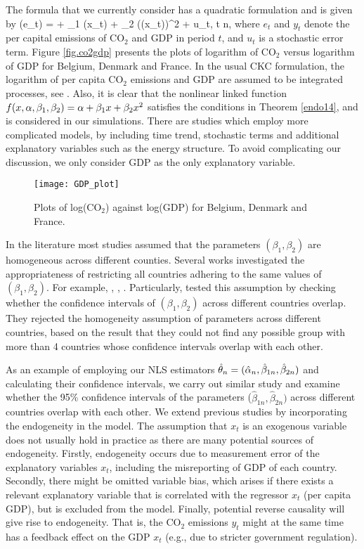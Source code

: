 The formula that we currently consider has a quadratic formulation and is given by
\be {}
\ln(e_{t}) = \al + \beta_1 \ln(x_t) + \beta_2 (\ln(x_t))^2 + u_t,  \le t \le n,
\ee
where $e_t$ and $y_t$ denote the per capital emissions of CO$_2$ and GDP in period $t$, and $u_t$ is a stochastic error term. Figure \ref{fig.co2gdp} presents the plots of logarithm of CO$_2$ versus logarithm of GDP for Belgium, Denmark and France. In the usual CKC formulation, the logarithm of per capita CO$_2$ emissions and GDP are assumed to be integrated processes, see \cite{mullerwagner2007}. Also, it is clear that the nonlinear linked function $f(x, \alpha, \beta_1, \beta_2) = \alpha + \beta_1 x + \beta_2 x^2$ satisfies the conditions in Theorem \ref{endo14}, and is considered in our simulations. There are studies which employ more complicated models, by including time trend, stochastic terms and additional explanatory variables such as the energy structure. To avoid complicating our discussion, we only consider GDP as the only explanatory variable.

\medskip
\begin{figure}[hb]
  \centering
\texttt{[image: GDP\_plot]}
\caption{Plots of log(CO$_2$) against log(GDP) for Belgium, Denmark and France.}
\end{figure}

In the literature most studies assumed that the parameters $(\beta_1, \beta_2)$ are homogeneous across different counties. Several works investigated the appropriateness of restricting all countries adhering to the same values of $(\beta_1, \beta_2)$. For example, \cite{listgallet1999}, \cite{dijkgraafvollebergh2005}, \cite{piaggiopadilla2010}. Particularly, \cite{piaggiopadilla2010} tested this assumption by checking whether the confidence intervals of $(\beta_1, \beta_{2})$ across different countries overlap. They rejected the homogeneity assumption of parameters across different countries, based on the result that they could not find any possible group with more than 4 countries whose confidence intervals overlap with each other.

As an example of employing our NLS estimators $\hat{\theta}_n = (\hat{\alpha}_n, \hat{\beta}_{1n}, \hat{\beta}_{2n})$ and calculating their confidence intervals, we carry out similar study and examine whether the 95\% confidence intervals of the parameters ($\hat{\beta}_{1n}, \hat{\beta}_{2n})$ across different countries overlap with each other. We extend previous studies by incorporating the endogeneity in the model. The assumption that $x_t$ is an exogenous variable does not usually hold in practice as there are many potential sources of endogeneity. Firstly, endogeneity occurs due to measurement error of the explanatory variables $x_t$, including the misreporting of GDP of each country. Secondly, there might be omitted variable bias, which arises if there exists a relevant explanatory variable that is correlated with the regressor $x_t$ (per capita GDP), but is excluded from the model. Finally, potential reverse causality will give rise to endogeneity. That is, the CO$_2$ emissions $y_t$ might at the same time has a feedback effect on the GDP $x_t$ (e.g., due to stricter government regulation).


